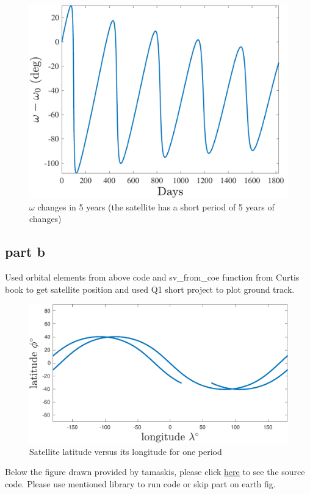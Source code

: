 \begin{figure}[H]
    \caption{$\omega$ changes in 5 years (the satellite has a short period of 5 years of changes)}
    \centering
    \includegraphics[width=12cm]{../Figure/Q2/omega_l_fig}
\end{figure}


\subsection{part b}
Used orbital elements from above code and sv\_from\_coe function from Curtis book to get satellite position and used Q1 short project to plot ground track.

\begin{figure}[H]
    \caption{Satellite latitude versus its longitude for one period}
    \centering
    \includegraphics[width=16cm]{../Figure/Q2/latlong}
\end{figure}

Below the figure drawn provided by tamaskis, please click \href{https://github.com/tamaskis/ground_track-MATLAB}{here} to see the source code. Please use mentioned library to run code or skip part on earth fig.

